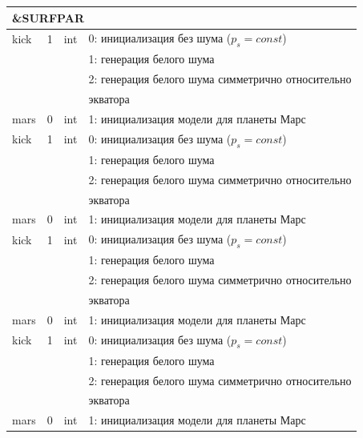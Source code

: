 \begin{longtable}[c]{|l|c|l|l|}
    \hline
    \multicolumn{4}{|l|}{\&SURFPAR}                                             \\ \hline
    kick     & 1      & int & 0: инициализация без шума (\(p_s = const\))       \\
             &        &     & 1: генерация белого шума                          \\
             &        &     & 2: генерация белого шума симметрично относительно \\
             &        &     & экватора                                          \\
    mars     & 0      & int & 1: инициализация модели для планеты Марс          \\
    kick     & 1      & int & 0: инициализация без шума (\(p_s = const\))       \\
             &        &     & 1: генерация белого шума                          \\
             &        &     & 2: генерация белого шума симметрично относительно \\
             &        &     & экватора                                          \\
    mars     & 0      & int & 1: инициализация модели для планеты Марс          \\
    kick     & 1      & int & 0: инициализация без шума (\(p_s = const\))       \\
             &        &     & 1: генерация белого шума                          \\
             &        &     & 2: генерация белого шума симметрично относительно \\
             &        &     & экватора                                          \\
    mars     & 0      & int & 1: инициализация модели для планеты Марс          \\
    kick     & 1      & int & 0: инициализация без шума (\(p_s = const\))       \\
             &        &     & 1: генерация белого шума                          \\
             &        &     & 2: генерация белого шума симметрично относительно \\
             &        &     & экватора                                          \\
    mars     & 0      & int & 1: инициализация модели для планеты Марс          \\

\end{longtable}
